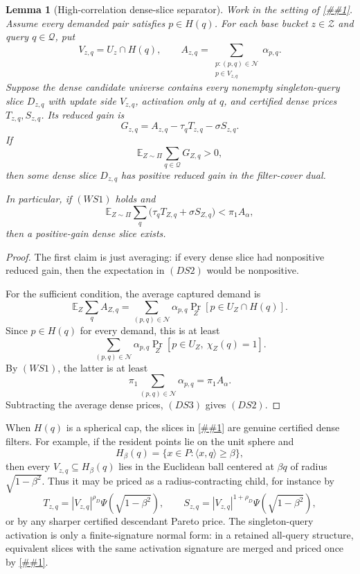 \documentclass[10pt]{article}
\newcommand{\cref}[1]{\ref{##1}}
\newtheorem{lemma}[theorem]{Lemma}
\theoremstyle{definition}
\newcommand{\E}{\mathbb{E}}
\newcommand{\ip}[2]{\langle #1,#2\rangle}
\begin{document}
\begin{lemma}[High-correlation dense-slice separator]
   \label{lem:high-correlation-dense-slice-separator}
   Work in the setting of \cref{lem:weighted-spherical-reduced-gain}.  Assume
   every demanded pair satisfies \(p\in H(q)\).  For each base bucket
   \(z\in\mathcal Z\) and query \(q\in\mathcal Q\), put
   \[
      V_{z,q}=U_z\cap H(q),
      \qquad
      A_{z,q}=\sum_{\substack{p:(p,q)\in\mathcal N\\ p\in V_{z,q}}}
      \alpha_{p,q}.
   \]
   Suppose the dense candidate universe contains every nonempty singleton-query
   slice \(D_{z,q}\) with update side \(V_{z,q}\), activation only at \(q\), and
   certified dense prices \(T_{z,q},S_{z,q}\).  Its reduced gain is
   \[
      G_{z,q}=A_{z,q}-\tau_qT_{z,q}-\sigma S_{z,q}.
      \tag{DS1}
   \]
   If
   \[
      \E_{Z\sim\Pi}\sum_{q\in\mathcal Q}G_{Z,q}>0,
      \tag{DS2}
   \]
   then some dense slice \(D_{z,q}\) has positive reduced gain in the
   filter-cover dual.

   In particular, if \((WS1)\) holds and
   \[
      \E_{Z\sim\Pi}\sum_q
      \bigl(\tau_qT_{Z,q}+\sigma S_{Z,q}\bigr)
      <
      \pi_1A_\alpha,
      \tag{DS3}
   \]
   then a positive-gain dense slice exists.
\end{lemma}

\begin{proof}
   The first claim is just averaging: if every dense slice had nonpositive
   reduced gain, then the expectation in \((DS2)\) would be nonpositive.

   For the sufficient condition, the average captured demand is
   \[
      \E_Z\sum_qA_{Z,q}
      =
      \sum_{(p,q)\in\mathcal N}
      \alpha_{p,q}\Pr_Z[p\in U_Z\cap H(q)].
   \]
   Since \(p\in H(q)\) for every demand, this is at least
   \[
      \sum_{(p,q)\in\mathcal N}
      \alpha_{p,q}\Pr_Z[p\in U_Z,\ \chi_Z(q)=1].
   \]
   By \((WS1)\), the latter is at least
   \[
      \pi_1\sum_{(p,q)\in\mathcal N}\alpha_{p,q}
      =
      \pi_1A_\alpha .
   \]
   Subtracting the average dense prices, \((DS3)\) gives \((DS2)\).
\end{proof}

When \(H(q)\) is a spherical cap, the slices in
\cref{lem:high-correlation-dense-slice-separator} are genuine certified dense
filters.  For example, if the resident points lie on the unit sphere and
\[
   H_\beta(q)=\{x\in P:\ip{x}{q}\ge\beta\},
\]
then every \(V_{z,q}\subseteq H_\beta(q)\) lies in the Euclidean ball centered
at \(\beta q\) of radius \(\sqrt{1-\beta^2}\).  Thus it may be priced as a
radius-contracting child, for instance by
\[
   T_{z,q}=|V_{z,q}|^{\rho_D}\Psi(\sqrt{1-\beta^2}),
   \qquad
   S_{z,q}=|V_{z,q}|^{1+\rho_D}\Psi(\sqrt{1-\beta^2}),
\]
or by any sharper certified descendant Pareto price.  The singleton-query
activation is only a finite-signature normal form: in a retained all-query
structure, equivalent slices with the same activation signature are merged and
priced once by \cref{lem:finite-signature-filter-cover}.
\end{document}
